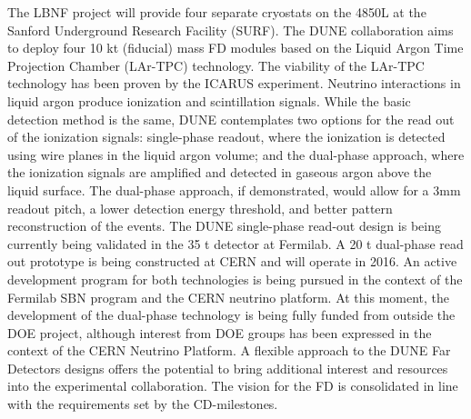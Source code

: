 The LBNF project will provide four separate cryostats on the 4850L at the 
Sanford Underground Research Facility (SURF).  
The DUNE collaboration aims to deploy four 10 kt (fiducial) mass FD modules based 
on the Liquid Argon Time Projection Chamber (LAr-TPC) technology. The viability 
of the LAr-TPC technology has been proven by the ICARUS experiment. Neutrino 
interactions in liquid argon produce ionization and scintillation signals. While 
the basic detection method is the same, DUNE contemplates two options for the read 
out of the ionization signals: single-phase readout, where the ionization is detected 
using wire planes in the liquid argon volume; and the dual-phase approach, where 
the ionization signals are amplified and detected in gaseous argon above the liquid 
surface. The dual-phase approach, if demonstrated, would allow for a 3mm readout 
pitch, a lower detection energy threshold, and better pattern reconstruction of 
the events. The DUNE single-phase read-out design is being currently being validated 
in the 35 t detector at Fermilab. A 20 t dual-phase read out prototype is being 
constructed at CERN and will operate in 2016. An active development program for 
both technologies is being pursued in the context of the Fermilab SBN program and 
the CERN neutrino platform. At this moment, the development of the dual-phase technology 
is being fully funded from outside the DOE project, although interest from DOE 
groups has been expressed in the context of the CERN Neutrino Platform. A flexible 
approach to the DUNE Far Detectors designs offers the potential to bring additional 
interest and resources into the experimental collaboration. The vision for the 
FD is consolidated in line with the requirements set by the CD-milestones.

